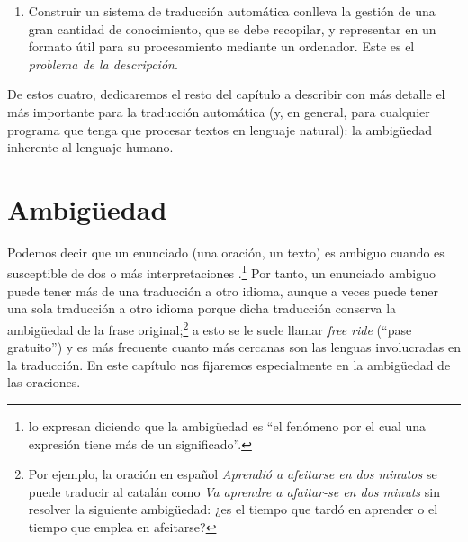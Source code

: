 \begin{enumerate}
\item Construir un sistema de traducción automática conlleva la gestión de una gran cantidad de conocimiento, que se debe recopilar, y representar en un formato útil para su procesamiento mediante un ordenador. Este es el \emph{problema de la descripción}. \end{enumerate} 

De estos cuatro, dedicaremos el resto del capítulo a describir con más detalle el más importante para la traducción automática (y, en general, para cualquier programa que tenga que procesar textos en lenguaje natural): la ambigüedad inherente al lenguaje humano. 

\section{Ambigüedad} 

Podemos decir que un enunciado (una oración, un texto) es ambiguo cuando es susceptible de dos o más interpretaciones \citep{alcaraz97b}.\footnote{\citet{don96u} lo expresan diciendo que la ambigüedad es ``el fenómeno por el cual una expresión tiene más de un significado''.} Por tanto, un enunciado ambiguo puede tener más de una traducción a otro idioma, aunque a veces puede tener una sola traducción a otro idioma porque dicha traducción conserva la ambigüedad de la frase original;\footnote{Por ejemplo, la oración en español \emph{Aprendió a afeitarse en dos minutos} se puede traducir al catalán como \emph{Va aprendre a afaitar-se en dos minuts} sin resolver la siguiente ambigüedad: ¿es el tiempo que tardó en aprender o el tiempo que emplea en afeitarse?} a esto se le suele llamar \emph{free ride} (``pase gratuito'') y es más frecuente cuanto más cercanas son las lenguas involucradas en la traducción. En este capítulo nos fijaremos especialmente en la ambigüedad de las oraciones. 

